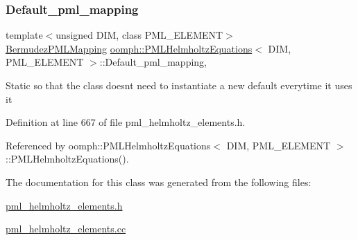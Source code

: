 \subsubsection{\texorpdfstring{Default\+\_\+pml\+\_\+mapping}{Default\_pml\_mapping}}
{\footnotesize\ttfamily template$<$unsigned D\+IM, class P\+M\+L\+\_\+\+E\+L\+E\+M\+E\+NT$>$ \\
\hyperlink{classoomph_1_1BermudezPMLMapping}{Bermudez\+P\+M\+L\+Mapping} \hyperlink{classoomph_1_1PMLHelmholtzEquations}{oomph\+::\+P\+M\+L\+Helmholtz\+Equations}$<$ D\+IM, P\+M\+L\+\_\+\+E\+L\+E\+M\+E\+NT $>$\+::Default\+\_\+pml\+\_\+mapping\hspace{0.3cm}{\ttfamily [static]}, {\ttfamily [protected]}}

Static so that the class doesn\textquotesingle{}t need to instantiate a new default everytime it uses it 

Definition at line 667 of file pml\+\_\+helmholtz\+\_\+elements.\+h.



Referenced by oomph\+::\+P\+M\+L\+Helmholtz\+Equations$<$ D\+I\+M, P\+M\+L\+\_\+\+E\+L\+E\+M\+E\+N\+T $>$\+::\+P\+M\+L\+Helmholtz\+Equations().



The documentation for this class was generated from the following files\+:\begin{DoxyCompactItemize}
\item 
\hyperlink{pml__helmholtz__elements_8h}{pml\+\_\+helmholtz\+\_\+elements.\+h}\item 
\hyperlink{pml__helmholtz__elements_8cc}{pml\+\_\+helmholtz\+\_\+elements.\+cc}\end{DoxyCompactItemize}
